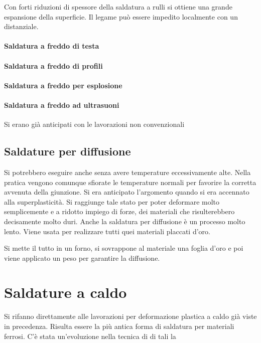 Con forti riduzioni di spessore della saldatura a rulli si ottiene una grande espansione della superficie.
Il legame può essere impedito localmente con un distanziale.

\paragraph{Saldatura a freddo di testa}
\paragraph{Saldatura a freddo di profili}
\paragraph{Saldatura a freddo per esplosione}
\paragraph{Saldatura a freddo ad ultrasuoni}
Si erano già anticipati con le lavorazioni non convenzionali

\subsection{Saldature per diffusione}
Si potrebbero eseguire anche senza avere temperature eccessivamente alte. Nella pratica vengono comunque sfiorate le temperature normali per favorire la corretta avvenuta della giunzione.
Si era anticipato l'argomento quando si era accennato alla superplasticità.
Si raggiunge tale stato per poter deformare molto semplicemente e a ridotto impiego di forze, dei materiali che risulterebbero decisamente molto duri.
Anche la saldatura per diffusione è un processo molto lento.
Viene usata per realizzare tutti quei materiali placcati d'oro.

Si mette il tutto in un forno, si sovrappone al materiale una foglia d'oro e poi viene applicato un peso per garantire la diffusione.


\section{Saldature a caldo}
Si rifanno direttamente alle lavorazioni per deformazione plastica a caldo già viste in precedenza.
Risulta essere la più antica forma di saldatura per materiali ferrosi.
C'è stata un'evoluzione nella tecnica di di tali la\todo{\\Aggiungi}

